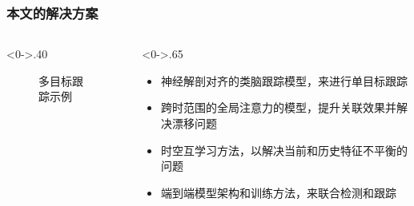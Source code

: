 \begin{frame}
	\frametitle{本文的解决方案}
	\begin{columns}[T] %
		\begin{column}<0->{.40\textwidth}
			\begin{figure}[thpb]
				\centering
				\caption{多目标跟踪示例}
			\end{figure}
		\end{column}
		\hfill%
		\begin{column}<0->{.65\textwidth}
			\begin{itemize}
				\item<1-> 神经解剖对齐的类脑跟踪模型，来进行单目标跟踪
				\item<1-> 跨时范围的全局注意力的模型，提升关联效果并解决漂移问题
				\item<1-> 时空互学习方法，以解决当前和历史特征不平衡的问题
				\item<1-> 端到端模型架构和训练方法，来联合检测和跟踪
				
			\end{itemize}
		\end{column}%
	\end{columns}
\end{frame}